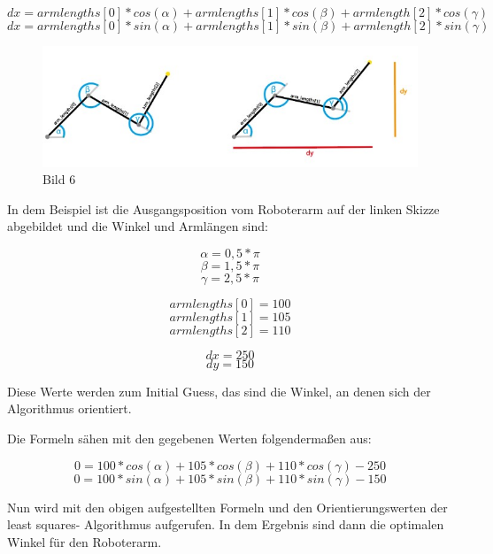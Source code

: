 \documentclass[12pt]{article}
\begin{document}
    \[
        dx = armlengths[0] * cos(\alpha) + armlengths[1] * cos(\beta) + armlength[2] * cos(\gamma)
    \]
    \[
        dx = armlengths[0] * sin(\alpha) + armlengths[1] * sin(\beta) + armlength[2] * sin(\gamma)
    \]

    

    \begin{figure}[h]
        \centering
        \includegraphics[width = \linewidth]{Bild 6}
        \caption{Bild 6}
    \end{figure}

    In dem Beispiel ist die Ausgangsposition vom Roboterarm auf der linken Skizze abgebildet und die
    Winkel und Armlängen sind:

    \[
        \alpha = 0,5*\pi
    \]
    \[
        \beta = 1,5 * \pi
    \]
    \[
        \gamma = 2,5 * \pi
    \]

    \[
        armlengths[0] = 100
    \]
    \[
        armlengths[1] = 105
    \]
    \[
        armlengths[2] = 110
    \]

    \[
        dx = 250
    \]
    \[
        dy = 150
    \]

    Diese Werte werden zum Initial Guess, das sind die Winkel, an denen sich der Algorithmus
    orientiert.

    

    Die Formeln sähen mit den gegebenen Werten folgendermaßen aus:

    \[
        0 = 100 * cos(\alpha) + 105 * cos(\beta) + 110 * cos(\gamma) -250
    \]
    \[
        0 = 100 * sin(\alpha) + 105 * sin(\beta) + 110 * sin(\gamma) -150
    \]

    Nun wird mit den obigen aufgestellten Formeln und den Orientierungswerten der least squares-
    Algorithmus aufgerufen. In dem Ergebnis sind dann die optimalen Winkel für den Roboterarm.

    
\end{document}
